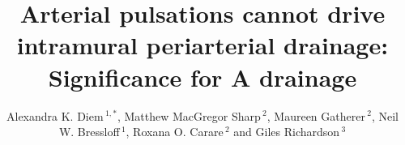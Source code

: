 \documentclass{frontiersFPHY} %
\newcommand{\Ab}{A\textbeta\xspace}
\def\firstAuthorLast{Diem {et~al.}} %
\def\Authors{Alexandra K. Diem\,$^{1,*}$, Matthew MacGregor Sharp\,$^{2}$, Maureen Gatherer\,$^{2}$, Neil W. Bressloff\,$^{1}$, Roxana O. Carare\,$^{2}$ and Giles Richardson\,$^3$}
\begin{document}
\onecolumn
{}

\title[Arterial pulsations cannot drive periarterial drainage]{Arterial pulsations cannot drive intramural periarterial drainage: Significance for \Ab drainage} 

\author[\firstAuthorLast ]{\Authors} %
\address{} %
\correspondance{} %

\extraAuth{}%


\maketitle

\end{document}
